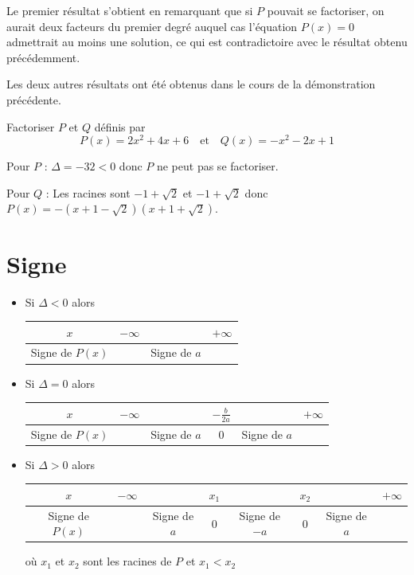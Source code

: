 \documentclass[french]{book}
\begin{document}
\begin{demo}
Le premier résultat s'obtient en remarquant que si $P$ pouvait se factoriser, on aurait deux facteurs du premier degré auquel cas l'équation $P(x)=0$ admettrait au moins une solution, ce qui est contradictoire avec le résultat obtenu précédemment.

Les deux autres résultats ont été obtenus dans le cours de la démonstration précédente.
\end{demo}

\begin{exemple}
Factoriser $P$ et $Q$ définis par
 \[P(x)=2x^{2}+4x+6 \quad \text{et} \quad Q(x)=-x^{2}-2x+1\]
\end{exemple}


Pour $P$ : $\Delta=-32<0$ donc $P$ ne peut pas se factoriser.

Pour $Q$ : Les racines sont $-1+\sqrt{2}$ et $-1+\sqrt{2}$ donc $P(x)=-(x+1-\sqrt{2})(x+1+\sqrt{2})$.

%
\section{Signe}
\begin{prop}
\begin{itemize}
\item Si $\Delta<0$ alors
\begin{tabular}[c]{|c|ccc|} \hline
$x$ & $-\infty$ &  & $+\infty$ \\ \hline
Signe de $P(x)$ &  & Signe de $a$ & \\ \hline
\end{tabular}
\item Si $\Delta=0$ alors
\begin{tabular}[c]{|c|ccccc|} \hline
$x$ & $-\infty$ &  & $-\frac{b}{2a}$ &  & $+\infty$ \\ \hline
Signe de $P(x)$ &  & Signe de $a$ & $0$ & Signe de $a$ & \\ \hline
\end{tabular}
\item Si $\Delta>0$ alors

\vspace{1ex}
\begin{tabular}[c]{|c|ccccccc|} \hline
$x$ & $-\infty$ &  & $x_{1}$ &  & $x_{2}$ &  & $+\infty$ \\ \hline
Signe de $P(x)$ &  & Signe de $a$ & $0$ & Signe de $-a$ & $0$ & Signe de $a$ & \\ \hline
\end{tabular}

\vspace{1ex}
\hspace*{1cm}où $x_{1}$ et $x_{2}$ sont les racines de $P$ et $x_{1}<x_{2}$
\end{itemize}
\end{prop}
\end{document}
